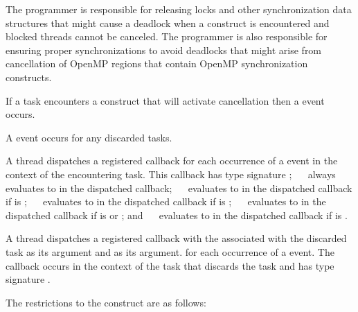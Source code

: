 \begin{note}
The programmer is responsible for releasing locks and
other synchronization data structures that might cause a deadlock when
a  construct is encountered and blocked threads cannot be
canceled. The programmer is also responsible for ensuring proper
synchronizations to avoid deadlocks that might arise from cancellation
of OpenMP regions that contain OpenMP synchronization constructs.
\end{note}

\events

If a task encounters a  construct that will
  activate cancellation then a  event occurs.

A  event occurs for any discarded tasks.

\tools

A thread dispatches a registered  callback 
for each occurrence of a  event in the context of the encountering 
task. This callback has type signature ; 
\code{(}~\code{&}~ always evaluates 
to  in the dispatched callback; 
\code{(}~\code{&}~ evaluates to 
 in the dispatched callback if  is
; 
\code{(}~\code{&}~ evaluates to 
 in the dispatched callback if  is
; 
\code{(}~\code{&}~ evaluates to 
 in the dispatched callback if  is
 or ; and 
\code{(}~\code{&}~ evaluates to 
 in the dispatched callback if  is
. 

A thread dispatches a registered  callback with
the  associated with the discarded task as its  
argument and  as its  argument.
for each occurrence of a  event. The callback occurs in 
the context of the task that discards the task and has type signature 
.

\restrictions
The restrictions to the  construct are as follows:

